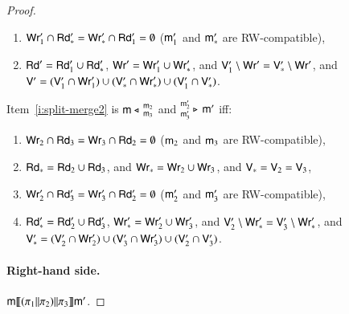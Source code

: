 \begin{proof}
\begin{enumerate}[resume]
    
    \item $\writeset'_1 \cap \readset'_* = \writeset'_* \cap \readset'_1 = \emptyset$ ($\modl'_1$ and $\modl'_*$ are RW-compatible),
    \item $\readset' = \readset'_1 \cup \readset'_*$, $\writeset' = \writeset'_1 \cup \writeset'_*$, and $\valuset'_1 \setminus \writeset' = \valuset'_* \setminus \writeset'$, and $\valuset' = (\valuset'_1 \cap \writeset'_1) \cup (\valuset'_* \cap \writeset'_*) \cup (\valuset'_1 \cap \valuset'_*) $. 
\end{enumerate}
Item~\ref{i:split-merge2} is $\splt{\modl}{\modl_2} {\modl_3} $ and $\mrg{\modl'}{\modl'_2} {\modl'_3} $ iff:
\begin{enumerate}[resume]
\item
  $\writeset_2 \cap \readset_3 = \writeset_3 \cap \readset_2 = \emptyset$ ($\modl_2$ and $\modl_3$ are RW-compatible),
  \item 
    $\readset_* = \readset_2 \cup \readset_3 $, and $\writeset_* = \writeset_2 \cup \writeset_3$, and $\valuset_* = \valuset_2 = \valuset_3$,

    
    \item $\writeset'_2 \cap \readset'_3 = \writeset'_3 \cap \readset'_2 = \emptyset$ ($\modl'_2$ and $\modl'_3$ are RW-compatible),
    \item\label{i:lhslast} $\readset_*' = \readset'_2 \cup \readset'_3$, $\writeset_*' = \writeset'_2 \cup \writeset'_3$, and $\valuset'_2 \setminus \writeset_*' = \valuset'_3 \setminus \writeset_*'$, and $\valuset_*' = (\valuset'_2 \cap \writeset'_2) \cup (\valuset'_3 \cap \writeset'_3) \cup (\valuset'_2 \cap \valuset'_3) $. 
\end{enumerate}


\paragraph{Right-hand side.} $\modl \intPgm{ (\pi_1 \pll \pi_2) \pll \pi_3 } \modl'$.


\end{proof}
